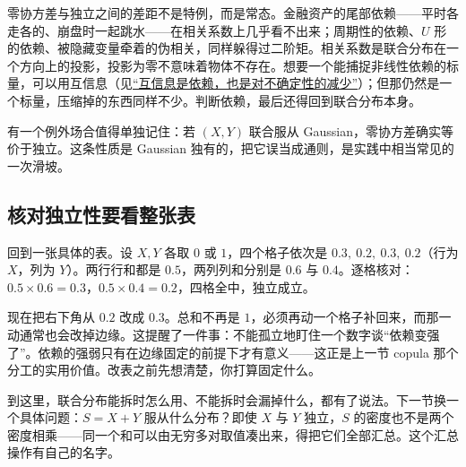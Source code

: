 零协方差与独立之间的差距不是特例，而是常态。金融资产的尾部依赖——平时各走各的、崩盘时一起跳水——在相关系数上几乎看不出来；周期性的依赖、\(U\) 形的依赖、被隐藏变量牵着的伪相关，同样躲得过二阶矩。相关系数是联合分布在一个方向上的投影，投影为零不意味着物体不存在。想要一个能捕捉非线性依赖的标量，可以用互信息（见\hyperref[sec:07-Information-Theory/02-Joint-Information/02]{``互信息是依赖，也是对不确定性的减少''}）；但那仍然是一个标量，压缩掉的东西同样不少。判断依赖，最后还得回到联合分布本身。

有一个例外场合值得单独记住：若 \((X,Y)\) 联合服从 Gaussian，零协方差确实等价于独立。这条性质是 Gaussian 独有的，把它误当成通则，是实践中相当常见的一次滑坡。

\subsection{核对独立性要看整张表}

回到一张具体的表。设 \(X,Y\) 各取 \(0\) 或 \(1\)，四个格子依次是 \(0.3,\ 0.2,\ 0.3,\ 0.2\)（行为 \(X\)，列为 \(Y\)）。两行行和都是 \(0.5\)，两列列和分别是 \(0.6\) 与 \(0.4\)。逐格核对：\(0.5\times0.6=0.3\)，\(0.5\times0.4=0.2\)，四格全中，独立成立。

现在把右下角从 \(0.2\) 改成 \(0.3\)。总和不再是 \(1\)，必须再动一个格子补回来，而那一动通常也会改掉边缘。这提醒了一件事：不能孤立地盯住一个数字谈``依赖变强了''。依赖的强弱只有在边缘固定的前提下才有意义——这正是上一节 copula 那个分工的实用价值。改表之前先想清楚，你打算固定什么。

到这里，联合分布能拆时怎么用、不能拆时会漏掉什么，都有了说法。下一节换一个具体问题：\(S=X+Y\) 服从什么分布？即使 \(X\) 与 \(Y\) 独立，\(S\) 的密度也不是两个密度相乘——同一个和可以由无穷多对取值凑出来，得把它们全部汇总。这个汇总操作有自己的名字。
